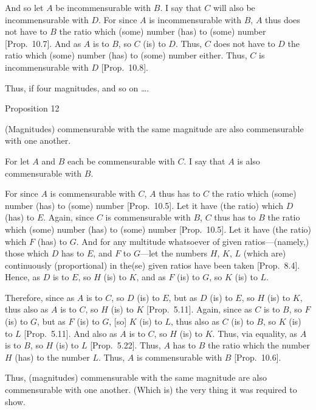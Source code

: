 And so let $A$ be incommensurable with $B$. I say that $C$ will also
be incommensurable with $D$. For since $A$ is incommensurable with
$B$, $A$ thus does not have to $B$ the ratio which  (some) number (has) to
(some) number [Prop.~10.7]. And as $A$ is to $B$, so $C$ (is) to $D$. Thus, $C$ does not have to $D$ the ratio which (some) number (has) to
(some) number either. Thus, $C$ is incommensurable with $D$ [Prop.~10.8].

Thus, if four magnitudes, and so on \ldots.


\begin{center}
{\large Proposition 12}
\end{center}

(Magnitudes) commensurable with the same magnitude are also commensurable with one another.

For let $A$ and $B$ each be commensurable with $C$. I say that
$A$ is also commensurable with $B$.

For since $A$ is commensurable with $C$, $A$ thus has to $C$ the
ratio which (some) number (has) to (some) number [Prop.~10.5]. Let it have (the ratio) which $D$ (has)
to $E$. Again, since $C$ is commensurable with $B$, $C$ thus has to $B$
the ratio which (some) number (has) to (some) number [Prop.~10.5].  Let it have (the ratio) which $F$ (has) to $G$. And for any multitude whatsoever of given ratios---(namely,) those
which $D$ has to $E$, and $F$ to $G$---let the numbers $H$, $K$, $L$
(which are) continuously (proportional) in the(se) given ratios have been taken [Prop.~8.4]. Hence, as $D$ is to $E$, so $H$ (is) to $K$, and as $F$ (is) to $G$, so $K$ (is) to $L$.

\centerline{}

Therefore, since as $A$ is to $C$, so $D$ (is) to $E$, but as $D$ (is) to 
$E$, so $H$ (is) to $K$, thus also as $A$ is to $C$, so $H$ (is) to $K$
[Prop.~5.11]. Again, since as $C$ is to $B$, 
so $F$ (is) to $G$, but as $F$ (is) to $G$, [so] $K$ (is) to $L$, 
thus also as $C$ (is) to $B$, so $K$ (is) to $L$ [Prop.~5.11]. And also as $A$ is to $C$, so $H$ (is) to $K$. Thus, via equality, as $A$ is to $B$, so $H$ (is) to $L$ [Prop.~5.22]. Thus, $A$ has to $B$ the ratio
which the number $H$ (has) to the number $L$. Thus, $A$ is commensurable
with $B$ [Prop.~10.6].

Thus, (magnitudes) commensurable with the same magnitude are also commensurable with one another. (Which is) the very thing it was required
to show.

